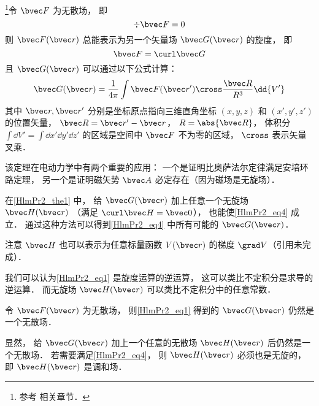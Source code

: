 
\begin{issues}
\issueTODO
\end{issues}


\begin{theorem}{}\label{HlmPr2_the1}
\footnote{参考 \cite{GriffE} 相关章节．}令 $\bvec F$ 为无散场， 即
\begin{equation}
\div \bvec F = 0
\end{equation}
则 $\bvec F(\bvec r)$ 总能表示为另一个矢量场 $\bvec G(\bvec r)$ 的旋度， 即
\begin{equation}\label{HlmPr2_eq4}
\bvec F = \curl \bvec G
\end{equation}
且 $\bvec G(\bvec r)$ 可以通过以下公式计算：
\begin{equation}\label{HlmPr2_eq1}
\bvec G(\bvec r) = \frac{1}{4\pi}\int \bvec F(\bvec r') \cross \frac{\bvec R}{R^3} \dd{V'}
\end{equation}
其中 $\bvec r, \bvec r'$ 分别是坐标原点指向三维直角坐标 $(x, y, z)$ 和 $(x', y', z')$ 的位置矢量， $\bvec R = \bvec r' - \bvec r$， $R = \abs{\bvec R}$， 体积分 $\int\dd{V'} = \int\dd{x'}\dd{y'}\dd{z'}$ 的区域是空间中 $\bvec F$ 不为零的区域， $\cross$ 表示矢量叉乘．
\end{theorem}

该定理在电动力学中有两个重要的应用： 一个是证明比奥萨法尔定律满足安培环路定理， 另一个是证明磁矢势 $\bvec A$ 必定存在（因为磁场是无旋场）．

\begin{corollary}{}\label{HlmPr2_cor1}
在\autoref{HlmPr2_the1} 中， 给 $\bvec G(\bvec r)$ 加上任意一个无旋场 $\bvec H(\bvec r)$ （满足 $\curl \bvec H = \bvec 0$）， 也能使\autoref{HlmPr2_eq4} 成立． 通过这种方法可以得到\autoref{HlmPr2_eq4} 中所有可能的 $\bvec G(\bvec r)$．
\end{corollary}
注意 $\bvec H$ 也可以表示为任意标量函数 $V(\bvec r)$ 的梯度 $\grad V$（引用未完成）．

我们可以认为\autoref{HlmPr2_eq1} 是旋度运算的逆运算， 这可以类比不定积分是求导的逆运算． 而无旋场 $\bvec H(\bvec r)$ 可以类比不定积分中的任意常数．

\begin{theorem}{}\label{HlmPr2_the2}
令 $\bvec F(\bvec r)$ 为无散场， 则\autoref{HlmPr2_eq1} 得到的 $\bvec G(\bvec r)$ 仍然是一个无散场．
\end{theorem}
显然， 给 $\bvec G(\bvec r)$ 加上一个任意的无散场 $\bvec H(\bvec r)$ 后仍然是一个无散场． 若需要满足\autoref{HlmPr2_eq4}， 则 $\bvec H(\bvec r)$ 必须也是无旋的， 即 $\bvec H(\bvec r)$ 是调和场．

